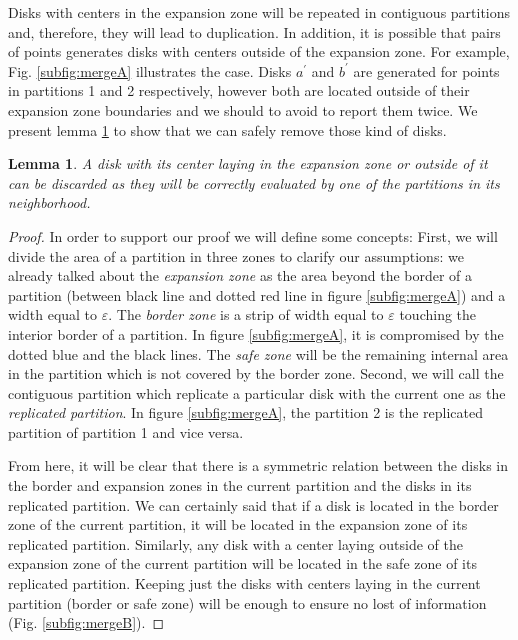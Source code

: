 \documentclass[journal,onecolumn]{IEEEtran}
\newtheorem{lemma}{Lemma}
\begin{document}
\begin{itemize}
Disks with centers in the expansion zone will be repeated in contiguous partitions and, therefore, they will lead to duplication.  In addition, it is possible that pairs of points generates disks with centers outside of the expansion zone.  For example, Fig. \ref{subfig:mergeA} illustrates the case.  Disks $a^\prime$ and $b^\prime$ are generated for points in partitions 1 and 2 respectively, however both are located outside of their expansion zone boundaries and we should to avoid to report them twice.  We present lemma \ref{lemma:disks} to show that we can safely remove those kind of disks.

\begin{lemma}\label{lemma:disks}
A disk with its center laying in the expansion zone or outside of it can be discarded as they will be correctly evaluated by one of the partitions in its neighborhood. 
\end{lemma}

\begin{proof}
  In order to support our proof we will define some concepts:  First, we will divide the area of a partition in three zones to clarify our assumptions:  we already talked about the \textit{expansion zone} as the area beyond the border of a partition (between black line and dotted red line in figure \ref{subfig:mergeA}) and a width equal to $\varepsilon$.  The \textit{border zone} is a strip of width equal to $\varepsilon$ touching the interior border of a partition.  In figure \ref{subfig:mergeA}, it is compromised by the dotted blue and the black lines.  The \textit{safe zone} will be the remaining internal area in the partition which is not covered by the border zone.  Second, we will call the contiguous partition which replicate a particular disk with the current one as the \textit{replicated partition}. In figure \ref{subfig:mergeA}, the partition 2 is the replicated partition of partition 1 and vice versa.

  From here, it will be clear that there is a symmetric relation between the disks in the border and expansion zones in the current partition and the disks in its replicated partition.  We can certainly said that if a disk is located in the border zone of the current partition, it will be located in the expansion zone of its replicated partition.  Similarly, any disk with a center laying outside of the expansion zone of the current partition will be located in the safe zone of its replicated partition.  Keeping just the disks with centers laying in the current partition (border or safe zone) will be enough to ensure no lost of information (Fig. \ref{subfig:mergeB}).
\end{proof}


\end{itemize}
\end{document}
